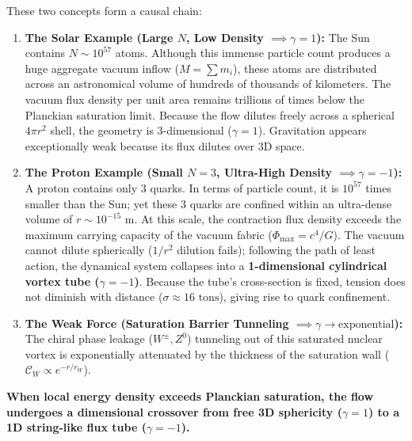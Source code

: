 These two concepts form a causal chain:
\begin{enumerate}
    \item \textbf{The Solar Example (Large $N$, Low Density $\implies \gamma = 1$):} The Sun contains $N \sim 10^{57}$ atoms. Although this immense particle count produces a huge aggregate vacuum inflow ($M = \sum m_i$), these atoms are distributed across an astronomical volume of hundreds of thousands of kilometers. The vacuum flux density per unit area remains trillions of times below the Planckian saturation limit. Because the flow dilutes freely across a spherical $4\pi r^2$ shell, the geometry is 3-dimensional ($\gamma = 1$). Gravitation appears exceptionally weak because its flux dilutes over 3D space.
    \item \textbf{The Proton Example (Small $N=3$, Ultra-High Density $\implies \gamma = -1$):} A proton contains only 3 quarks. In terms of particle count, it is $10^{57}$ times smaller than the Sun; yet these 3 quarks are confined within an ultra-dense volume of $r \sim 10^{-15}\text{ m}$. At this scale, the contraction flux density exceeds the maximum carrying capacity of the vacuum fabric ($\Phi_{\max} = c^4/G$). The vacuum cannot dilute spherically ($1/r^2$ dilution fails); following the path of least action, the dynamical system collapses into a \textbf{1-dimensional cylindrical vortex tube ($\gamma = -1$)}. Because the tube's cross-section is fixed, tension does not diminish with distance ($\sigma \approx 16\text{ tons}$), giving rise to quark confinement.
    \item \textbf{The Weak Force (Saturation Barrier Tunneling $\implies \gamma \to \text{exponential}$):} The chiral phase leakage ($W^\pm, Z^0$) tunneling out of this saturated nuclear vortex is exponentially attenuated by the thickness of the saturation wall ($\mathcal{C}_W \propto e^{-r/r_W}$).
\end{enumerate}
\textbf{When local energy density exceeds Planckian saturation, the flow undergoes a dimensional crossover from free 3D sphericity ($\gamma = 1$) to a 1D string-like flux tube ($\gamma = -1$).}

